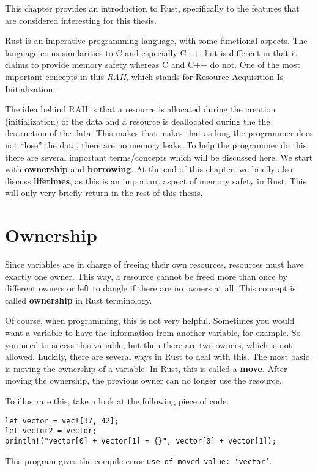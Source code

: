 This chapter provides an introduction to Rust, specifically to the features that are considered interesting for this thesis. 

Rust is an imperative programming language, with some functional aspects. The language coins similarities to C and especially C++, but is different in that it claims to provide memory safety whereas C and C++ do not. One of the most important concepts in this \emph{RAII}, which stands for Resource Acquisition Is Initialization. 

The idea behind RAII is that a resource is allocated during the creation (initialization) of the data and a resource is deallocated during the the destruction of the data. This makes that makes that as long the programmer does not ``lose'' the data, there are no memory leaks. To help the programmer do this, there are several important terms/concepts which will be discussed here. We start with \textbf{ownership} and \textbf{borrowing}. At the end of this chapter, we briefly also discuss \textbf{lifetimes}, as this is an important aspect of memory safety in Rust. This will only very briefly return in the rest of this thesis. 

\section{Ownership} %
Since variables are in charge of freeing their own resources, resources must have exactly one owner. This way, a resource cannot be freed more than once by different owners or left to dangle if there are no owners at all. This concept is called \textbf{ownership} in Rust terminology. 

Of course, when programming, this is not very helpful. Sometimes you would want a variable to have the information from another variable, for example. So you need to access this variable, but then there are two owners, which is not allowed. Luckily, there are several ways in Rust to deal with this. The most basic is moving the ownership of a variable. In Rust, this is called a \textbf{move}. After moving the ownership, the previous owner can no longer use the resource. 

To illustrate this, take a look at the following piece of code. 
\begin{verbatim}
let vector = vec![37, 42];
let vector2 = vector;
println!("vector[0] + vector[1] = {}", vector[0] + vector[1]);
\end{verbatim}
This program gives the compile error \texttt{use of moved value: `vector'}. 

